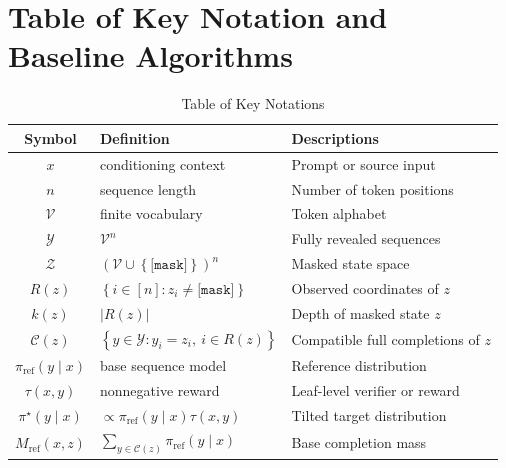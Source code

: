 \documentclass{article}
\numberwithin{theorem}{section}
\numberwithin{proposition}{section}
\numberwithin{corollary}{section}
\numberwithin{lemma}{section}
\numberwithin{conjecture}{section}
\numberwithin{remark}{section}
\numberwithin{definition}{section}
\numberwithin{assumption}{section}
\numberwithin{example}{section}
\newcommand{\calC}{{\mathcal{C}}}
\newcommand{\calV}{{\mathcal{V}}}
\newcommand{\calY}{{\mathcal{Y}}}
\newcommand{\calZ}{{\mathcal{Z}}}
\newcommand{\lbra}[1]{\left[#1\right]}
\newcommand{\mbra}[1]{\left\{#1\right\}}
\newcommand{\sbra}[1]{\left(#1\right)}
\newcommand{\abs}[1]{\left| #1\right|}
\begin{document}
\section{Table of Key Notation and Baseline Algorithms}
\label{app:sec:key_notation_and_remarks}
\renewcommand{\arraystretch}{1.3}
\begin{table}[ht]
\caption{Table of Key Notations}
\label{tab:notation}
\vspace{5pt}
\centering
\renewcommand{\arraystretch}{1.3}
\begin{tabular}{c l l}
\toprule
\textbf{Symbol} & \textbf{Definition} & \textbf{Descriptions} \\
\midrule

$x$
  & conditioning context
  & Prompt or source input \\

$n$
  & sequence length
  & Number of token positions \\

$\calV$
  & finite vocabulary
  & Token alphabet \\

$\calY$
  & $\calV^n$
  & Fully revealed sequences \\

$\calZ$
  & $\sbra{\calV \cup \mbra{\texttt{[mask]}}}^n$
  & Masked state space \\

$R\sbra{z}$
  & $\mbra{i \in \lbra{n} : z_i \neq \texttt{[mask]}}$
  & Observed coordinates of $z$ \\

$k\sbra{z}$
  & $\abs{R\sbra{z}}$
  & Depth of masked state $z$ \\

$\calC\sbra{z}$
  & $\mbra{y \in \calY : y_i = z_i,\ i \in R\sbra{z}}$
  & Compatible full completions of $z$ \\

$\pi_{\mathrm{ref}}\sbra{y \mid x}$
  & base sequence model
  & Reference distribution \\

$\tau\sbra{x,y}$
  & nonnegative reward
  & Leaf-level verifier or reward \\

$\pi^\star\sbra{y \mid x}$
  & $\propto \pi_{\mathrm{ref}}\sbra{y \mid x}\tau\sbra{x,y}$
  & Tilted target distribution \\

$M_{\mathrm{ref}}\sbra{x,z}$
  & $\sum_{y \in \calC\sbra{z}} \pi_{\mathrm{ref}}\sbra{y \mid x}$
  & Base completion mass \\


\end{tabular}
\end{table}
\end{document}
